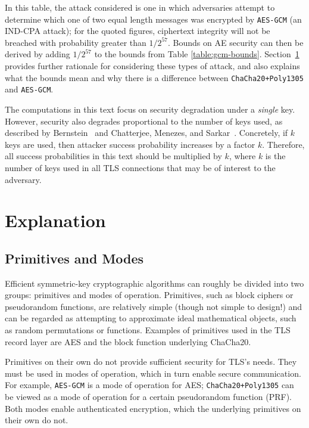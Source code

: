\documentclass{article}
\begin{document}
In this table, the attack considered is one in which adversaries attempt to determine which one of two equal length messages was encrypted by \texttt{AES-GCM} (an IND-CPA attack); for the quoted figures, ciphertext integrity will not be breached with probability greater than $1/2^{57}$. Bounds on AE security can then be derived by adding  $1/2^{57}$ to the bounds from Table \ref{table:gcm-bounds}. Section~\ref{sec:explanation} provides further rationale for considering these types of attack, and also explains what the bounds mean and why there is a difference between \texttt{ChaCha20+Poly1305} and \texttt{AES-GCM}.

The computations in this text focus on security degradation under a \emph{single} key. However, security also degrades proportional to the number of keys used, as described by Bernstein~\cite{bernsteinblog} and Chatterjee, Menezes, and Sarkar~\cite{DBLP:conf/sacrypt/ChatterjeeMS11,DBLP:journals/iacr/ChatterjeeMS11}. Concretely, if $k$ keys are used, then attacker success probability increases by a factor $k$. Therefore, all success probabilities in this text should be multiplied by $k$, where $k$ is the number of keys used in all TLS connections that may be of interest to the adversary. %

\section{Explanation}\label{sec:explanation}

\subsection{Primitives and Modes}
Efficient symmetric-key cryptographic algorithms can roughly be divided into two groups: primitives and modes of operation. Primitives, such as block ciphers or pseudorandom functions, are relatively simple (though not simple to design!) and can be regarded as attempting to approximate ideal mathematical objects, such as random permutations or functions. Examples of primitives used in the TLS record layer are AES and the block function underlying ChaCha20. 

Primitives on their own do not provide sufficient security for TLS's needs. They must be used in modes of operation, which in turn enable secure communication. For example, \texttt{AES-GCM} is a mode of operation for AES; \texttt{ChaCha20+Poly1305} can be viewed as a mode of operation for a certain pseudorandom function (PRF). Both modes enable authenticated encryption, which the underlying primitives on their own do not.
\end{document}
